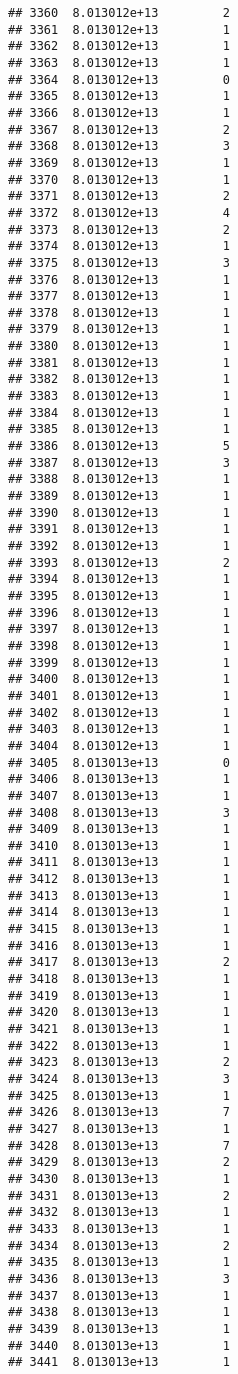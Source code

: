 \documentclass[
]{article}
\begin{document}
\begin{verbatim}
## 3360  8.013012e+13         2
## 3361  8.013012e+13         1
## 3362  8.013012e+13         1
## 3363  8.013012e+13         1
## 3364  8.013012e+13         0
## 3365  8.013012e+13         1
## 3366  8.013012e+13         1
## 3367  8.013012e+13         2
## 3368  8.013012e+13         3
## 3369  8.013012e+13         1
## 3370  8.013012e+13         1
## 3371  8.013012e+13         2
## 3372  8.013012e+13         4
## 3373  8.013012e+13         2
## 3374  8.013012e+13         1
## 3375  8.013012e+13         3
## 3376  8.013012e+13         1
## 3377  8.013012e+13         1
## 3378  8.013012e+13         1
## 3379  8.013012e+13         1
## 3380  8.013012e+13         1
## 3381  8.013012e+13         1
## 3382  8.013012e+13         1
## 3383  8.013012e+13         1
## 3384  8.013012e+13         1
## 3385  8.013012e+13         1
## 3386  8.013012e+13         5
## 3387  8.013012e+13         3
## 3388  8.013012e+13         1
## 3389  8.013012e+13         1
## 3390  8.013012e+13         1
## 3391  8.013012e+13         1
## 3392  8.013012e+13         1
## 3393  8.013012e+13         2
## 3394  8.013012e+13         1
## 3395  8.013012e+13         1
## 3396  8.013012e+13         1
## 3397  8.013012e+13         1
## 3398  8.013012e+13         1
## 3399  8.013012e+13         1
## 3400  8.013012e+13         1
## 3401  8.013012e+13         1
## 3402  8.013012e+13         1
## 3403  8.013012e+13         1
## 3404  8.013012e+13         1
## 3405  8.013013e+13         0
## 3406  8.013013e+13         1
## 3407  8.013013e+13         1
## 3408  8.013013e+13         3
## 3409  8.013013e+13         1
## 3410  8.013013e+13         1
## 3411  8.013013e+13         1
## 3412  8.013013e+13         1
## 3413  8.013013e+13         1
## 3414  8.013013e+13         1
## 3415  8.013013e+13         1
## 3416  8.013013e+13         1
## 3417  8.013013e+13         2
## 3418  8.013013e+13         1
## 3419  8.013013e+13         1
## 3420  8.013013e+13         1
## 3421  8.013013e+13         1
## 3422  8.013013e+13         1
## 3423  8.013013e+13         2
## 3424  8.013013e+13         3
## 3425  8.013013e+13         1
## 3426  8.013013e+13         7
## 3427  8.013013e+13         1
## 3428  8.013013e+13         7
## 3429  8.013013e+13         2
## 3430  8.013013e+13         1
## 3431  8.013013e+13         2
## 3432  8.013013e+13         1
## 3433  8.013013e+13         1
## 3434  8.013013e+13         2
## 3435  8.013013e+13         1
## 3436  8.013013e+13         3
## 3437  8.013013e+13         1
## 3438  8.013013e+13         1
## 3439  8.013013e+13         1
## 3440  8.013013e+13         1
## 3441  8.013013e+13         1

\end{verbatim}
\end{document}
